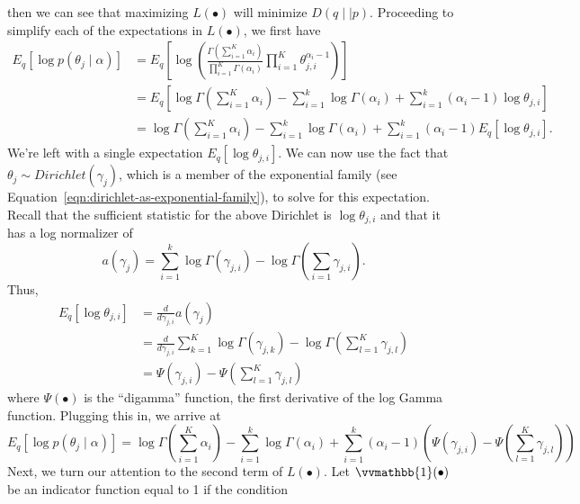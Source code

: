 \documentclass[11pt]{article}
\newcommand{\indicator}{\vvmathbb{1}}
\begin{document}
then we can see that maximizing $L(\bullet)$ will minimize $D(q\mid\mid
p)$. Proceeding to simplify each of the expectations in $L(\bullet)$, we
first have
\begin{align}
  E_q\left[\log p(\theta_j \mid \alpha)\right]
  &=
  E_q\left[
    \log \left(
      \frac{\Gamma(\sum_{i=1}^K \alpha_i)}
      {\prod_{i=1}^K \Gamma(\alpha_i)}
      \prod_{i=1}^K \theta_{j,i}^{\alpha_i - 1}
    \right)
  \right]
  \\&=
  E_q\left[
    \log \Gamma\left(\sum_{i=1}^K \alpha_i\right)
    - \sum_{i=1}^k \log \Gamma(\alpha_i)
    + \sum_{i=1}^k (\alpha_i - 1)\log \theta_{j,i}
  \right]
  \\&=
  \log \Gamma\left(\sum_{i=1}^K \alpha_i\right)
  - \sum_{i=1}^k \log \Gamma(\alpha_i)
  + \sum_{i=1}^k (\alpha_i - 1)E_q\left[\log \theta_{j,i}\right].
\end{align}
We're left with a single expectation $E_q[\log \theta_{j,i}]$. We can now
use the fact that $\theta_j \sim Dirichlet(\gamma_j)$, which is a member of
the exponential family (see
Equation~\ref{eqn:dirichlet-as-exponential-family}), to solve for this
expectation. Recall that the sufficient statistic for the above Dirichlet
is $\log \theta_{j,i}$ and that it has a log normalizer of
\begin{equation}
  a(\gamma_j) = \sum_{i=1}^k \log
  \Gamma(\gamma_{j,i}) - \log \Gamma\left(\sum_{i=1} \gamma_{j,i}\right).
\end{equation}
Thus,
\begin{align}
  \label{eqn:digamma-beg}
  E_q\left[\log \theta_{j,i}\right]
  &=
  \frac{d}{d\gamma_{j,i}} a(\gamma_j)
  \\&=
  \frac{d}{d\gamma_{j,i}} \sum_{k=1}^K \log \Gamma(\gamma_{j,k})
  - \log \Gamma\left(\sum_{l=1}^K \gamma_{j,l}\right)
  \\&=
  \Psi(\gamma_{j,i}) - \Psi\left(\sum_{l=1}^K \gamma_{j,l}\right)
  \label{eqn:digamma-end}
\end{align}
where $\Psi(\bullet)$ is the ``digamma'' function, the first derivative of
the log Gamma function. Plugging this in, we arrive at
\begin{equation}
  E_q\left[\log p(\theta_j \mid \alpha)\right]
  =
  \log \Gamma\left(\sum_{i=1}^K \alpha_i\right)
  - \sum_{i=1}^k \log \Gamma(\alpha_i)
  + \sum_{i=1}^k (\alpha_i - 1)
  \left(\Psi(\gamma_{j,i}) - \Psi\left(\sum_{l=1}^K \gamma_{j,l}\right)\right)
\end{equation}
Next, we turn our attention to the second term of $L(\bullet)$. Let
$\indicator(\bullet)$ be an indicator function equal to 1 if the condition
\end{document}
